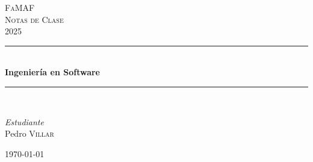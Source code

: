 \begin{titlepage} 
	\newcommand{\HRule}{\rule{\linewidth}{0.5mm}}
	
	\center 
	
	
	\textsc{\LARGE FaMAF}\\[1.5cm] 
	
	\textsc{\Large Notas de Clase}\\[0.5cm] 
	
	\textsc{\large 2025}\\[0.5cm] 
	
	
	\HRule\\[0.4cm]
	
	{\huge\bfseries Ingeniería en Software}\\[0.4cm] 
	
	\HRule\\[1.5cm]
	
	
	\begin{minipage}{0.4\textwidth}
		\begin{flushleft}
			\large
			\textit{Estudiante}\\
			Pedro \textsc{Villar} 
		\end{flushleft}
	\end{minipage}
	
	
	
	\vfill\vfill\vfill 
	
	{\large\today} 

	
	
	\vfill 
	
\end{titlepage}